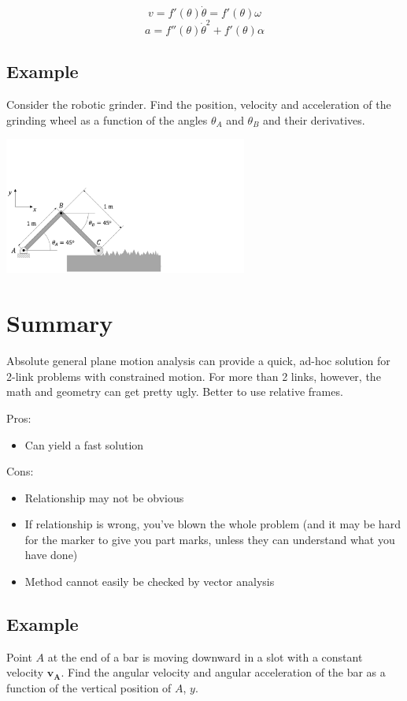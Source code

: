 \documentclass[12pt,letterpaper,twoside]{report}
\begin{document}
\[ v = f'(\theta) \dot{\theta} = f'(\theta) \omega
\]
\[a = f''(\theta) \dot{\theta}^2 + f'(\theta) \alpha
\]

\subsection{Example}
Consider the robotic grinder. Find the position, velocity and acceleration of the grinding wheel as a function of the angles $\theta_A$ and $\theta_B$ and their derivatives.  

\includegraphics[trim={0cm 0cm 12cm 7cm},clip,width=0.6\textwidth, left]{Slide29} 

\newpage

\section{Summary}
Absolute general plane motion analysis can provide a quick, ad-hoc solution for 2-link problems with constrained motion.  For more than 2 links, however, the math and geometry can get pretty ugly.  Better to use relative frames. 

Pros:
\begin{itemize}
\item Can yield a fast solution
\end{itemize}

Cons:
\begin{itemize}
\item Relationship may not be obvious
\item If relationship is wrong, you've blown the whole problem (and it may be hard for the marker to give you part marks, unless they can understand what you have done)
\item Method cannot easily be checked by vector analysis
\end{itemize}

\subsection{Example}
Point $A$ at the end of a bar is moving downward in a slot with a constant velocity $\bm{v_A}$.  Find the angular velocity and angular acceleration of the bar as a function of the vertical position of $A$, $y$. 
\end{document}
